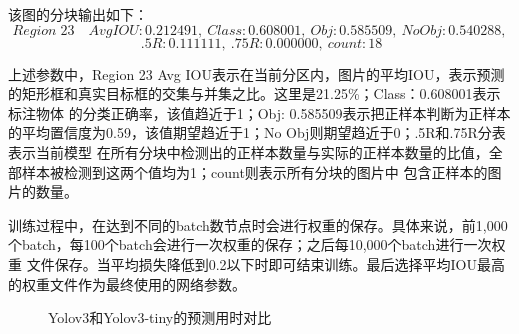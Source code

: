 该图的分块输出如下：
$$Region\;23 \quad Avg IOU: 0.212491, \  Class: 0.608001, \  Obj: 0.585509, \  No Obj: 0.540288, $$
$$\ .5R: 0.111111, \ .75R: 0.000000, \  count: 18$$

上述参数中，Region 23 Avg IOU表示在当前分区内，图片的平均IOU，表示预测的矩形框和真实目标框的交集与并集之比。这里是21.25\%；Class：0.608001表示标注物体
的分类正确率，该值趋近于1；Obj: 0.585509表示把正样本判断为正样本的平均置信度为0.59，该值期望趋近于1；No Obj则期望趋近于0；.5R和.75R分表表示当前模型
在所有分块中检测出的正样本数量与实际的正样本数量的比值，全部样本被检测到这两个值均为1；count则表示所有分块的图片中
包含正样本的图片的数量。

训练过程中，在达到不同的batch数节点时会进行权重的保存。具体来说，前1,000个batch，每100个batch会进行一次权重的保存；之后每10,000个batch进行一次权重
文件保存。当平均损失降低到0.2以下时即可结束训练。最后选择平均IOU最高的权重文件作为最终使用的网络参数。


\begin{figure}[t]
    \centering
    \caption{Yolov3和Yolov3-tiny的预测用时对比}
    \label{fig:inf_time}
\end{figure}

